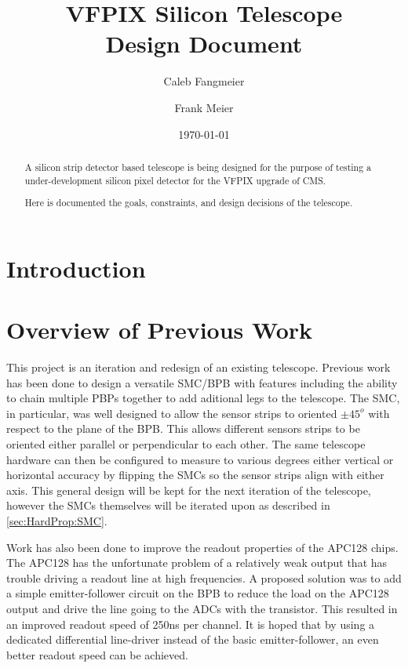 \documentclass{article}
\begin{document}
\title{VFPIX Silicon Telescope \\ Design Document}
\author{Caleb Fangmeier}
\author{Frank Meier}
\date{\today}


\maketitle

\begin{abstract}
  A silicon strip detector based telescope is being designed for the purpose of testing a under-development silicon pixel detector for the VFPIX upgrade of CMS.

  Here is documented the goals, constraints, and design decisions of the telescope.
\end{abstract}

\listoftodos

\newpage

\tableofcontents

\newpage

\section{Introduction}

\section{Overview of Previous Work}
\label{sec:PreviousWork}

This project is an iteration and redesign of an existing telescope. Previous work\cite{Turner2012} has been done to design a versatile SMC/BPB with features including the ability to chain multiple PBPs together to add aditional legs to the telescope. The SMC, in particular, was well designed to allow the sensor strips to oriented $\pm45^o$ with respect to the plane of the BPB. This allows different sensors strips to be oriented either parallel or perpendicular to each other. The same telescope hardware can then be configured to measure to various degrees either vertical or horizontal accuracy by flipping the SMCs so the sensor strips align with either axis. This general design will be kept for the next iteration of the telescope, however the SMCs themselves will be iterated upon as described in \ref{sec:HardProp:SMC}.

Work has also been done to improve the readout properties of the APC128 chips.\cite{Ryser2013} The APC128 has the unfortunate problem of a relatively weak output that has trouble driving a readout line at high frequencies. A proposed solution was to add a simple emitter-follower circuit on the BPB to reduce the load on the APC128 output and drive the line going to the ADCs with the transistor. This resulted in an improved readout speed of 250ns per channel. It is hoped that by using a dedicated differential line-driver instead of the basic emitter-follower, an even better readout speed can be achieved.
\end{document}
